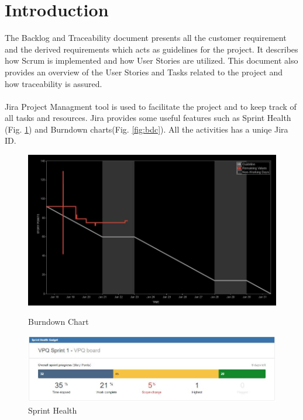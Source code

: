 \section{Introduction}
The Backlog and Traceability document presents all the customer requirement and the derived requirements which acts as guidelines for the project. It describes how Scrum is implemented and how User Stories are utilized. This document also provides an overview of the User Stories and Tasks related to the project and how traceability is assured. \\
\\
Jira Project Managment tool is used to facilitate the project and to keep track of all tasks and resources. Jira provides some useful features such as Sprint Health (Fig. \ref{fig:sh}) and Burndown charts(Fig. \ref{fig:bdc}). All the activities has a uniqe Jira ID.
\\ 

\begin{figure}[h]
        \centering
         \begin{minipage}[b]{0.3\textwidth}
            \includegraphics[width = 1\textwidth]{VAPIQ-PICTURES/BDC}
            \caption{Burndown Chart}
            \label{fig:bdc}
        \end{minipage}
        \hfill
        \begin{minipage}[b]{0.6\textwidth}
            \includegraphics[width = 1\textwidth]{VAPIQ-PICTURES/SH}
            \caption{Sprint Health}
            \label{fig:sh}
        \end{minipage}
\end{figure}


